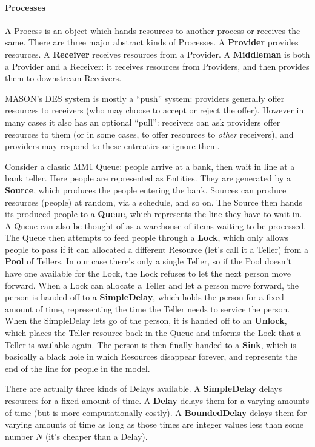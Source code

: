 \documentclass[twoside,10pt]{article}
\begin{document}
\paragraph{Processes}  A Process is an object which hands resources to another process or receives the same.  There are three major abstract kinds of Processes.  A {\bf Provider} provides resources.  A {\bf Receiver} receives resources from a Provider.  A {\bf Middleman} is both a Provider and a Receiver: it receives resources from Providers, and then provides them to downstream Receivers.

MASON's DES system is mostly a ``push'' system: providers generally offer resources to receivers (who may choose to accept or reject the offer).  However in many cases it also has an optional ``pull'':  receivers can ask providers offer resources to them (or in some cases, to offer resources to {\it other} receivers), and providers may respond to these entreaties or ignore them.

Consider a classic MM1 Queue: people arrive at a bank, then wait in line at a bank teller.  Here people are represented as Entities.  They are generated by a {\bf Source}, which produces the people entering the bank.  Sources can produce resources (people) at random, via a schedule, and so on.  The Source then hands its produced people to a {\bf Queue}, which represents the line they have to wait in.  A Queue can also be thought of as a warehouse of items waiting to be processed.  The Queue then attempts to feed people through a {\bf Lock}, which only allows people to pass if it can allocated a different Resource (let's call it a Teller) from a {\bf Pool} of Tellers.  In our case there's only a single Teller, so if the Pool doesn't have one available for the Lock, the Lock refuses to let the next person move forward.  When a Lock can allocate a Teller and let a person move forward, the person is handed off to a {\bf SimpleDelay}, which holds the person for a fixed amount of time, representing the time the Teller needs to service the person.  When the SimpleDelay lets go of the person, it is handed off to an {\bf Unlock}, which places the Teller resource back in the Queue and informs the Lock that a Teller is available again.  The person is then finally handed to a {\bf Sink}, which is basically a black hole in which Resources disappear forever, and represents the end of the line for people in the model.

There are actually three kinds of Delays available.  A {\bf SimpleDelay} delays resources for a fixed amount of time.  A {\bf Delay} delays them for a varying amounts of time (but is more computationally costly).  A {\bf BoundedDelay} delays them for varying amounts of time as long as those times are integer values less than some number \(N\) (it's cheaper than a Delay).
\end{document}
